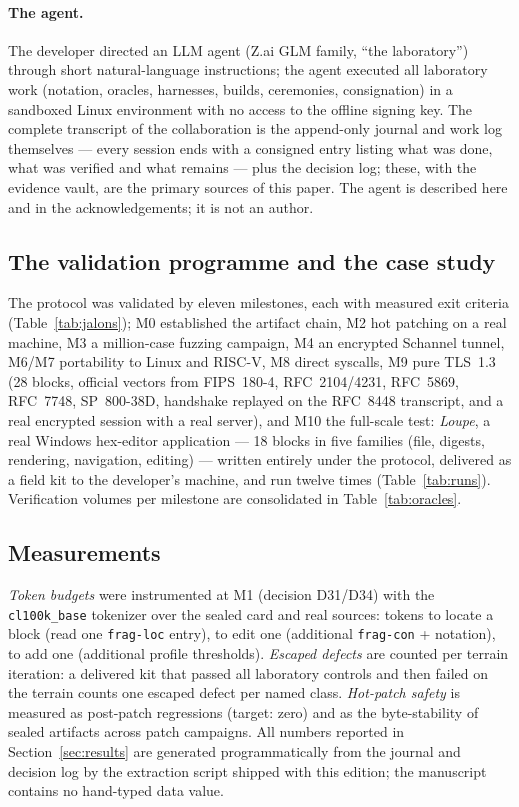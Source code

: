 \documentclass[11pt,a4paper]{article}
\newcommand{\code}[1]{\texttt{\small #1}}
\begin{document}
\paragraph{The agent.}
The developer directed an LLM agent (Z.ai GLM family, ``the laboratory'')
through short natural-language instructions; the agent executed all
laboratory work (notation, oracles, harnesses, builds, ceremonies,
consignation) in a sandboxed Linux environment with no access to the
offline signing key. The complete transcript of the collaboration is the
append-only journal and work log themselves --- every session ends with a
consigned entry listing what was done, what was verified and what remains
--- plus the decision log; these, with the evidence vault, are the
primary sources of this paper. The agent is described here and in the
acknowledgements; it is not an author.

\subsection{The validation programme and the case study}\label{sec:cas}

The protocol was validated by eleven milestones, each with measured exit
criteria (Table~\ref{tab:jalons}); M0 established the artifact chain,
M2 hot patching on a real machine, M3 a million-case fuzzing campaign,
M4 an encrypted Schannel tunnel, M6/M7 portability to Linux and RISC-V,
M8 direct syscalls, M9 pure TLS~1.3 (28 blocks, official vectors from
FIPS~180-4, RFC~2104/4231, RFC~5869, RFC~7748, SP~800-38D, handshake
replayed on the RFC~8448 transcript, and a real encrypted session with a
real server), and M10 the full-scale test: \emph{Loupe}, a real Windows
hex-editor application --- 18 blocks in five families (file, digests,
rendering, navigation, editing) --- written entirely under the protocol,
delivered as a field kit to the developer's machine, and run twelve times
(Table~\ref{tab:runs}). Verification volumes per milestone are
consolidated in Table~\ref{tab:oracles}.

\subsection{Measurements}\label{sec:mesures}

\emph{Token budgets} were instrumented at M1 (decision D31/D34) with the
\code{cl100k\_base} tokenizer over the sealed card and real sources:
tokens to locate a block (read one \code{frag-loc} entry), to edit one
(additional \code{frag-con} + notation), to add one (additional
profile thresholds). \emph{Escaped defects} are counted per terrain
iteration: a delivered kit that passed all laboratory controls and then
failed on the terrain counts one escaped defect per named class.
\emph{Hot-patch safety} is measured as post-patch regressions (target:
zero) and as the byte-stability of sealed artifacts across patch
campaigns. All numbers reported in Section~\ref{sec:results} are
generated programmatically from the journal and decision log by the
extraction script shipped with this edition; the manuscript contains no
hand-typed data value.
\end{document}
